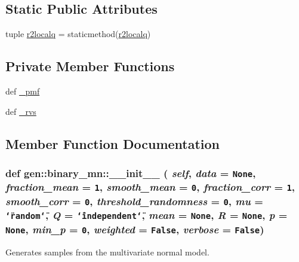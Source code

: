 \subsection*{Static Public Attributes}
\begin{CompactItemize}
\item 
tuple \hyperlink{classgen_1_1binary__mn_e27aacf71cc73e5a334eb14344706ddc}{r2localq} = staticmethod(\hyperlink{classgen_1_1binary__mn_e27aacf71cc73e5a334eb14344706ddc}{r2localq})
\end{CompactItemize}
\subsection*{Private Member Functions}
\begin{CompactItemize}
\item 
def \hyperlink{classgen_1_1binary__mn_a6f0dd2bcf5dc7087ce71b982408a963}{\_\-pmf}
\item 
def \hyperlink{classgen_1_1binary__mn_281d5cb707dd1b6845c3aa9d63a5558e}{\_\-rvs}
\end{CompactItemize}


\subsection{Member Function Documentation}
\hypertarget{classgen_1_1binary__mn_b3ee86170c3b41948a15567440c68fac}{
\subsubsection[{\_\-\_\-init\_\-\_\-}]{\setlength{\rightskip}{0pt plus 5cm}def gen::binary\_\-mn::\_\-\_\-init\_\-\_\- ( {\em self}, \/   {\em data} = {\tt None}, \/   {\em fraction\_\-mean} = {\tt 1}, \/   {\em smooth\_\-mean} = {\tt 0}, \/   {\em fraction\_\-corr} = {\tt 1}, \/   {\em smooth\_\-corr} = {\tt 0}, \/   {\em threshold\_\-randomness} = {\tt 0}, \/   {\em mu} = {\tt \char`\"{}random\char`\"{}}, \/   {\em Q} = {\tt \char`\"{}independent\char`\"{}}, \/   {\em mean} = {\tt None}, \/   {\em R} = {\tt None}, \/   {\em p} = {\tt None}, \/   {\em min\_\-p} = {\tt 0}, \/   {\em weighted} = {\tt False}, \/   {\em verbose} = {\tt False})}}
\label{classgen_1_1binary__mn_b3ee86170c3b41948a15567440c68fac}


Generates samples from the multivariate normal model. 

